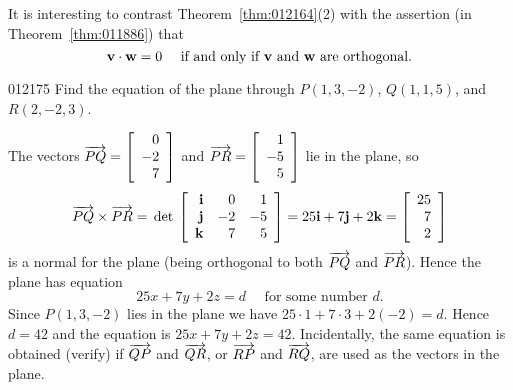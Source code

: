 \noindent It is interesting to contrast Theorem~\ref{thm:012164}(2) with the assertion (in Theorem~\ref{thm:011886}) that
\begin{equation*}
\textbf{v} \cdot \textbf{w} = 0 \quad \mbox{ if and only if }\textbf{v}\mbox{ and }\textbf{w}\mbox{ are orthogonal.}
\end{equation*}
\begin{example}{}{012175}
Find the equation of the plane through $P(1, 3, -2)$, $Q(1, 1, 5)$, and $R(2, -2, 3)$.

\begin{solution}
The vectors 
$\overrightarrow{PQ} = \left[
\begin{array}{r}
0\\
-2\\
7
\end{array}
\right]$
and 
$\overrightarrow{PR} = \left[
\begin{array}{r}
1\\
-5\\
5
\end{array}
\right]$
lie in the plane, so
\begin{equation*}
\overrightarrow{PQ} \times \overrightarrow{PR} = \thinspace\operatorname{det\medspace}\left[
\begin{array}{rrr}
\textbf{i} & 0 & 1\\
\textbf{j} & -2 & -5\\
\textbf{k} & 7 & 5
\end{array}
\right]
= 25\textbf{i} + 7\textbf{j} + 2\textbf{k}
= \left[
\begin{array}{r}
25\\
7\\
2
\end{array}
\right]
\end{equation*}
is a normal for the plane (being orthogonal to both $\overrightarrow{PQ}$ and $\overrightarrow{PR}$). Hence the plane has equation
\begin{equation*}
25x + 7y + 2z = d  \quad \mbox{ for some number }d.
\end{equation*}
Since $P(1, 3, -2)$ lies in the plane we have $25 \cdot 1 + 7 \cdot 3 + 2(-2) = d$. Hence $d = 42$ and the equation is $25x + 7y + 2z = 42$. Incidentally, the same equation is obtained (verify) if $\overrightarrow{QP}$ and $\overrightarrow{QR}$, or $\overrightarrow{RP}$ and $\overrightarrow{RQ}$, are used as the vectors in the plane.
\end{solution}
\end{example}



